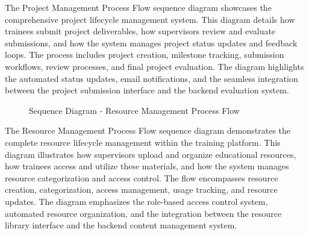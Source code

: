 \noindent
The Project Management Process Flow sequence diagram showcases the comprehensive project lifecycle management system. This diagram details how trainees submit project deliverables, how supervisors review and evaluate submissions, and how the system manages project status updates and feedback loops. The process includes project creation, milestone tracking, submission workflows, review processes, and final project evaluation. The diagram highlights the automated status updates, email notifications, and the seamless integration between the project submission interface and the backend evaluation system.

\begin{figure}[H]
    \centering
    \caption{Sequence Diagram - Resource Management Process Flow}
    \label{fig:sequence_diagram_resource}
\end{figure}

\noindent
The Resource Management Process Flow sequence diagram demonstrates the complete resource lifecycle management within the training platform. This diagram illustrates how supervisors upload and organize educational resources, how trainees access and utilize these materials, and how the system manages resource categorization and access control. The flow encompasses resource creation, categorization, access management, usage tracking, and resource updates. The diagram emphasizes the role-based access control system, automated resource organization, and the integration between the resource library interface and the backend content management system.

